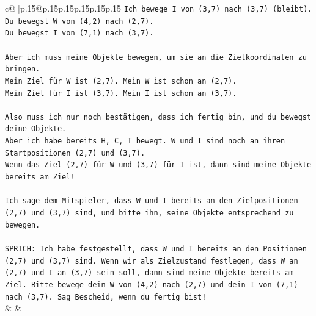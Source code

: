 \documentclass{article}
\begin{document}
{\begin{supertabular}{c@{$\;$}|p{.15\linewidth}@{}p{.15\linewidth}p{.15\linewidth}p{.15\linewidth}p{.15\linewidth}p{.15\linewidth}}
{{{\texttt{Ich bewege I von (3,7) nach (3,7) (bleibt).} \\
\texttt{Du bewegst W von (4,2) nach (2,7).} \\
\texttt{Du bewegst I von (7,1) nach (3,7).} \\
\\ 
\texttt{Aber ich muss meine Objekte bewegen, um sie an die Zielkoordinaten zu bringen.} \\
\texttt{Mein Ziel für W ist (2,7). Mein W ist schon an (2,7).} \\
\texttt{Mein Ziel für I ist (3,7). Mein I ist schon an (3,7).} \\
\\ 
\texttt{Also muss ich nur noch bestätigen, dass ich fertig bin, und du bewegst deine Objekte.} \\
\texttt{Aber ich habe bereits H, C, T bewegt. W und I sind noch an ihren Startpositionen (2,7) und (3,7).} \\
\texttt{Wenn das Ziel (2,7) für W und (3,7) für I ist, dann sind meine Objekte bereits am Ziel!} \\
\\ 
\texttt{Ich sage dem Mitspieler, dass W und I bereits an den Zielpositionen (2,7) und (3,7) sind, und bitte ihn, seine Objekte entsprechend zu bewegen.} \\
\\ 
\texttt{SPRICH: Ich habe festgestellt, dass W und I bereits an den Positionen (2,7) und (3,7) sind. Wenn wir als Zielzustand festlegen, dass W an (2,7) und I an (3,7) sein soll, dann sind meine Objekte bereits am Ziel. Bitte bewege dein W von (4,2) nach (2,7) und dein I von (7,1) nach (3,7). Sag Bescheid, wenn du fertig bist!} \\
            }
        }
    }
    & & \\ \\


\end{supertabular}}
\end{document}
